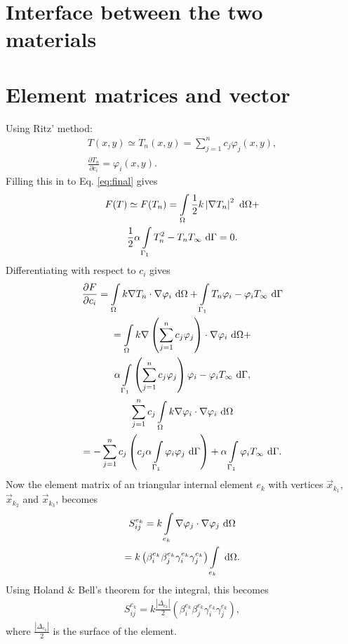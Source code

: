 \section{Interface between the two materials} 
\section{Element matrices and vector}
Using Ritz' method: 
\begin{gather*}
    T(x,y) \simeq T_n(x,y)=\sum_{j=1}^n c_j\varphi_j(x,y),\\
    \frac{\partial T_n}{\partial c_i}=\varphi_i(x,y).
\end{gather*} Filling this in to Eq. \ref{eq:final} gives
\begin{gather*}
    F(T)\simeq F(T_n) = \int\displaylimits_{\Omega}\frac{1}{2} k \left|\nabla T_n\right|^2~\text{d}\Omega + \\ \frac{1}{2}\alpha\int\displaylimits_{\Gamma_1}T_n^2-T_nT_{\infty}~\text{d}\Gamma = 0.
\end{gather*} Differentiating with respect to $c_i$ gives
\begin{gather*}
    \frac{\partial F}{\partial c_i} = \int\displaylimits_{\Omega}k\nabla T_n\cdot\nabla\varphi_i~\text{d}\Omega    +\int\displaylimits_{\Gamma_1}T_n\varphi_i-\varphi_iT_{\infty}~\text{d}\Gamma\\
    = \int\displaylimits_{\Omega}k\nabla\left(\sum_{j=1}^n c_j \varphi_j\right)\cdot \nabla \varphi_i~\text{d}\Omega + \\ \alpha\int\displaylimits_{\Gamma_1} \left(\sum_{j=1}^n c_j \varphi_j\right)\varphi_i - \varphi_i T_{\infty}~\text{d}\Gamma,\\
    \sum_{j=1}^n c_j \int\displaylimits_{\Omega}k\nabla\varphi_i\cdot \nabla \varphi_i~\text{d}\Omega \\
    = - \sum_{j=1}^n c_j\left(c_j\alpha\int\displaylimits_{\Gamma_1} \varphi_i \varphi_j~\text{d}\Gamma \right)+\alpha\int\displaylimits_{\Gamma_1}\varphi_i T_{\infty}~\text{d}\Gamma.
\end{gather*} Now the element matrix of an triangular internal element $e_k$ with vertices $\vec{x}_{k_1}$, $\vec{x}_{k_2}$ and $\vec{x}_{k_3}$, becomes
\begin{gather*}
    S_{ij}^{e_k} =  k\int\displaylimits_{e_k} \nabla \varphi_j \cdot \nabla \varphi_j~\text{d}\Omega \\
    = k\left(\beta_i^{e_k} \beta_j^{e_k} \gamma_i^{e_k} \gamma_j^{e_k} \right)\int\displaylimits_{e_k}~\text{d}\Omega.
\end{gather*} Using Holand \& Bell's theorem for the integral, this becomes
\begin{gather}
    S_{ij}^{e_k} = k \frac{|\Delta_{e_k}|}{2}\left(\beta_i^{e_k} \beta_j^{e_k} \gamma_i^{e_k} \gamma_j^{e_k} \right),
\end{gather} where $\frac{|\Delta_{e_k}|}{2}$ is the surface of the element.

